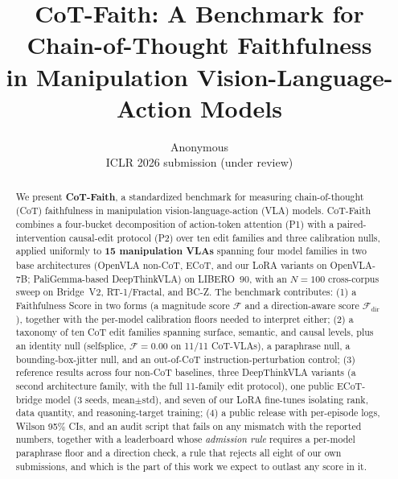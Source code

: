 \documentclass{article}
\title{\Large\bfseries CoT-Faith: A Benchmark for Chain-of-Thought Faithfulness \\
in Manipulation Vision-Language-Action Models}
\author{Anonymous \\ \small ICLR 2026 submission (under review)}
\date{}
\begin{document}
\maketitle
\thispagestyle{empty}

\begin{abstract}
We present \textbf{CoT-Faith}, a standardized benchmark for measuring chain-of-thought (CoT) faithfulness in manipulation vision-language-action (VLA) models. CoT-Faith combines a four-bucket decomposition of action-token attention (P1) with a paired-intervention causal-edit protocol (P2) over ten edit families and three calibration nulls, applied uniformly to \textbf{15 manipulation VLAs} spanning four model families in two base architectures (OpenVLA non-CoT, ECoT, and our LoRA variants on OpenVLA-7B; PaliGemma-based DeepThinkVLA) on LIBERO~90, with an $N{=}100$ cross-corpus sweep on Bridge~V2, RT-1/Fractal, and BC-Z. The benchmark contributes: (1) a Faithfulness Score in two forms (a magnitude score $\mathcal{F}$ and a direction-aware score $\mathcal{F}_{\text{dir}}$), together with the per-model calibration floors needed to interpret either; (2) a taxonomy of ten CoT edit families spanning surface, semantic, and causal levels, plus an identity null (selfsplice, $\mathcal{F}\!=\!0.00$ on 11/11 CoT-VLAs), a paraphrase null, a bounding-box-jitter null, and an out-of-CoT instruction-perturbation control; (3) reference results across four non-CoT baselines, three DeepThinkVLA variants (a second architecture family, with the full 11-family edit protocol), one public ECoT-bridge model (3 seeds, mean$\pm$std), and seven of our LoRA fine-tunes isolating rank, data quantity, and reasoning-target training; (4) a public release with per-episode logs, Wilson 95\% CIs, and an audit script that fails on any mismatch with the reported numbers, together with a leaderboard whose \emph{admission rule} requires a per-model paraphrase floor and a direction check, a rule that rejects all eight of our own submissions, and which is the part of this work we expect to outlast any score in it.


\end{abstract}
\end{document}

